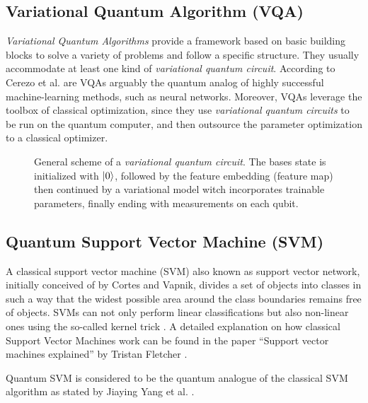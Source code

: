 \subsection{Variational Quantum Algorithm (VQA)}
\label{subsection:vqa_fundamentals}
\textit{Variational Quantum Algorithms} provide a framework based on basic building blocks to solve a variety of problems and follow a specific structure. They usually accommodate at least one kind of \textit{variational quantum circuit}. According to Cerezo et al. are VQAs arguably the quantum analog of highly successful machine-learning methods, such as neural networks. Moreover, VQAs leverage the toolbox of classical optimization, since they use \textit{variational quantum circuits} to be run on the quantum computer, and then outsource the parameter optimization to a classical optimizer\cite{Cerezo_2021}. 

\begin{figure}
    \centering
    \caption{General scheme of a \textit{variational quantum circuit}. The bases state is initialized with $\ket{0}$, followed by the feature 
    embedding (feature map) then continued by a variational model witch incorporates trainable parameters, finally ending with measurements on each qubit.} 
    \label{fig:general_scheme_vqc}
\end{figure}


\subsection{Quantum Support Vector Machine (SVM)}
A classical support vector machine (SVM) also known as support vector network, initially conceived of by Cortes and Vapnik, divides a set of objects into classes in such a way that the widest possible area around the class boundaries remains free of objects. SVMs can not only perform linear classifications but also non-linear ones using the so-called kernel trick \cite{Cortes2004SupportVectorN}. A detailed explanation on how classical Support Vector Machines work can be found in the paper “Support vector machines explained” by Tristan Fletcher \cite{fletcher2009support}. 

Quantum SVM is considered to be the quantum analogue of the classical SVM algorithm as stated by Jiaying Yang et al. \cite{yangSupportVectorMachines2019}.

